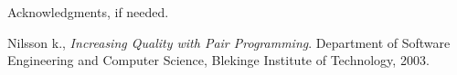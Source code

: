 \documentclass{sigplanconf}
\begin{document}
\acks

Acknowledgments, if needed.





\begin{thebibliography}{}
\softraggedright


  Nilsson k.,
  \emph{Increasing Quality with Pair Programming}.
  Department of Software Engineering and Computer Science,
  Blekinge Institute of Technology,
  2003.

\end{thebibliography}
\end{document}
